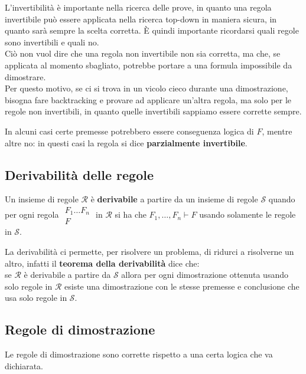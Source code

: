 \documentclass[
  a4paper,
]{article}
\begin{document}
L'invertibilità è importante nella ricerca delle prove, in quanto una
regola invertibile può essere applicata nella ricerca top-down in
maniera sicura, in quanto sarà sempre la scelta corretta. È quindi
importante ricordarsi quali regole sono invertibili e quali no.\\
Ciò non vuol dire che una regola non invertibile non sia corretta, ma
che, se applicata al momento sbagliato, potrebbe portare a una formula
impossibile da dimostrare.\\
Per questo motivo, se ci si trova in un vicolo cieco durante una
dimostrazione, bisogna fare backtracking e provare ad applicare un'altra
regola, ma solo per le regole non invertibili, in quanto quelle
invertibili sappiamo essere corrette sempre.

In alcuni casi certe premesse potrebbero essere conseguenza logica di
\(F\), mentre altre no: in questi casi la regola si dice
\textbf{parzialmente invertibile}.

\hypertarget{derivabilituxe0-delle-regole}{%
\subsection{Derivabilità delle
regole}\label{derivabilituxe0-delle-regole}}

Un insieme di regole \(\mathcal{R}\) è \textbf{derivabile} a partire da
un insieme di regole \(\mathcal{S}\) quando per ogni regola
\(\begin{matrix} F_1 \dots F_n \\\hline F\end{matrix}\) in
\(\mathcal{R}\) si ha che \(F_1, \dots, F_n \vdash F\) usando solamente
le regole in \(\mathcal{S}\).

La derivabilità ci permette, per risolvere un problema, di ridurci a
risolverne un altro, infatti il \textbf{teorema della derivabilità} dice
che:\\
se \(\mathcal{R}\) è derivabile a partire da \(\mathcal{S}\) allora per
ogni dimostrazione ottenuta usando solo regole in \(\mathcal{R}\) esiste
una dimostrazione con le stesse premesse e conclusione che usa solo
regole in \(\mathcal{S}\).

\hypertarget{regole-di-dimostrazione-1}{%
\subsection{Regole di dimostrazione}\label{regole-di-dimostrazione-1}}

Le regole di dimostrazione sono corrette rispetto a una certa logica che
va dichiarata.
\end{document}
